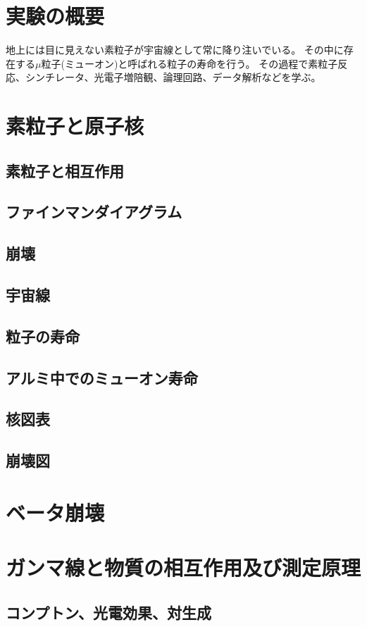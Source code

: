 \documentclass{jarticle}
\begin{document}
 \section*{実験の概要}
 地上には目に見えない素粒子が宇宙線として常に降り注いでいる。
 その中に存在する$\mu$粒子(ミューオン)と呼ばれる粒子の寿命を行う。
 その過程で素粒子反応、シンチレータ、光電子増陪観、論理回路、データ解析などを学ぶ。
 \section{素粒子と原子核}

  \subsection{素粒子と相互作用}
  \subsection{ファインマンダイアグラム}
  \subsection{崩壊}
  \subsection{宇宙線}
  \subsection{粒子の寿命}
  \subsection{アルミ中でのミューオン寿命}
  \subsection{核図表}
  \subsection{崩壊図}
  \section{ベータ崩壊}
  
  
 \section{ガンマ線と物質の相互作用及び測定原理}
  \subsection{コンプトン、光電効果、対生成}
\end{document}
